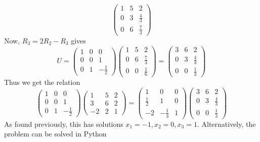 \begin{solution}
\[\begin{pmatrix}
                 1 & 5 & 2\\
                 0 & 3 & \frac{4}{3}\\
                 0 & 6 & \frac{7}{3}
               \end{pmatrix}
\]
  Now, \(R_{3} = 2R_{2} - R_{3}\) gives
  \[
U =
\begin{pmatrix}
            1 & 0 & 0\\
            0 & 0 & 1\\
            0 & 1 & -\frac{1}{2}
          \end{pmatrix}
          \begin{pmatrix}
            1 & 5 & 2\\
            0 & 6 & \frac{7}{3}\\
            0 & 0 & \frac{1}{6}
          \end{pmatrix}
=
        \begin{pmatrix}
          3 & 6 & 2\\
          0 & 3 & \frac{4}{3}\\
          0 & 0 & \frac{1}{3}
        \end{pmatrix}
\]
  Thus we get the relation
  \[
\begin{pmatrix}
       1 & 0 & 0\\
       0 & 0 & 1\\
       0 & 1 & -\frac{1}{2}
     \end{pmatrix}
     \begin{pmatrix}
       1 & 5 & 2\\
       3 & 6 & 2\\
       -2 & 2 & 1
     \end{pmatrix}
=
     \begin{pmatrix}
       1 & 0 & 0\\
       \frac{1}{2} & 1 & 0\\
       -2 & -\frac{1}{3} & 1
     \end{pmatrix}
     \begin{pmatrix}
       3 & 6 & 2\\
       0 & 3 & \frac{4}{3}\\
       0 & 0 & \frac{1}{3}
     \end{pmatrix}
\]
   As found previously, this has solutions \(x_{1} = -1, x_{2} = 0, x_{3} = 1\).
  Alternatively, the problem can be
  solved in Python
    \inputminted[frame = lines, bgcolor = lightgray, linenos]{python}{PythonSources/LUfactor.py}
\end{solution}
